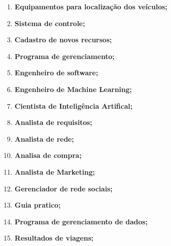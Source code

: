 \begin{enumerate}
      \item \textbf{Equipamentos para localização dos veículos; }



      \item \textbf{Sistema de controle;}



      \item \textbf{Cadastro de novos recursos;}


      \item \textbf{Programa de gerenciamento;}


      \item \textbf{Engenheiro de software;}


      \item \textbf{Engenheiro de Machine Learning;}


      \item \textbf{Cientista de Inteligência Artifical;}


      \item \textbf{Analista de requisitos;}


      \item \textbf{Analista de rede;}


      \item \textbf{Analisa de compra;}


      \item \textbf{Analista de Marketing;}


      \item \textbf{Gerenciador de rede sociais;}


      \item \textbf{Guia pratico;}


      \item \textbf{Programa de gerenciamento de dados;}




      \item \textbf{Resultados de viagens;}



\end{enumerate}
